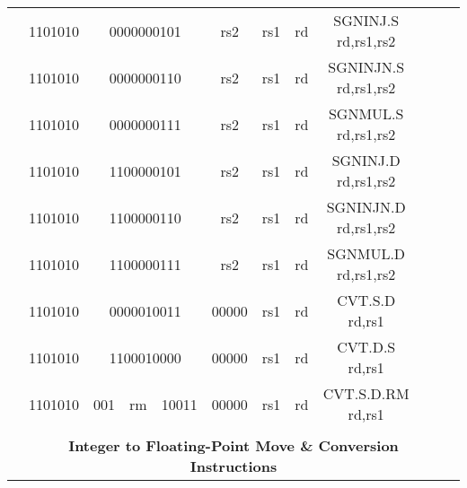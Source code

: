 \begin{table}[p]
\begin{small}
\begin{center}
\begin{tabular}{rcccccccccccl}
&
\multicolumn{1}{|c|}{1101010} &
\multicolumn{4}{c|}{0000000101} &
\multicolumn{1}{c|}{rs2} &
\multicolumn{1}{c|}{rs1} &
\multicolumn{1}{c|}{rd} & SGNINJ.S rd,rs1,rs2 \\
\cline{2-9}
  

&
\multicolumn{1}{|c|}{1101010} &
\multicolumn{4}{c|}{0000000110} &
\multicolumn{1}{c|}{rs2} &
\multicolumn{1}{c|}{rs1} &
\multicolumn{1}{c|}{rd} & SGNINJN.S rd,rs1,rs2 \\
\cline{2-9}
  

&
\multicolumn{1}{|c|}{1101010} &
\multicolumn{4}{c|}{0000000111} &
\multicolumn{1}{c|}{rs2} &
\multicolumn{1}{c|}{rs1} &
\multicolumn{1}{c|}{rd} & SGNMUL.S rd,rs1,rs2 \\
\cline{2-9}
  

&
\multicolumn{1}{|c|}{1101010} &
\multicolumn{4}{c|}{1100000101} &
\multicolumn{1}{c|}{rs2} &
\multicolumn{1}{c|}{rs1} &
\multicolumn{1}{c|}{rd} & SGNINJ.D rd,rs1,rs2 \\
\cline{2-9}
  

&
\multicolumn{1}{|c|}{1101010} &
\multicolumn{4}{c|}{1100000110} &
\multicolumn{1}{c|}{rs2} &
\multicolumn{1}{c|}{rs1} &
\multicolumn{1}{c|}{rd} & SGNINJN.D rd,rs1,rs2 \\
\cline{2-9}
  

&
\multicolumn{1}{|c|}{1101010} &
\multicolumn{4}{c|}{1100000111} &
\multicolumn{1}{c|}{rs2} &
\multicolumn{1}{c|}{rs1} &
\multicolumn{1}{c|}{rd} & SGNMUL.D rd,rs1,rs2 \\
\cline{2-9}
  

&
\multicolumn{1}{|c|}{1101010} &
\multicolumn{4}{c|}{0000010011} &
\multicolumn{1}{c|}{00000} &
\multicolumn{1}{c|}{rs1} &
\multicolumn{1}{c|}{rd} & CVT.S.D rd,rs1 \\
\cline{2-9}
  

&
\multicolumn{1}{|c|}{1101010} &
\multicolumn{4}{c|}{1100010000} &
\multicolumn{1}{c|}{00000} &
\multicolumn{1}{c|}{rs1} &
\multicolumn{1}{c|}{rd} & CVT.D.S rd,rs1 \\
\cline{2-9}
  

&
\multicolumn{1}{|c|}{1101010} &
\multicolumn{1}{c|}{001} &
\multicolumn{1}{c|}{rm} &
\multicolumn{2}{c|}{10011} &
\multicolumn{1}{c|}{00000} &
\multicolumn{1}{c|}{rs1} &
\multicolumn{1}{c|}{rd} & CVT.S.D.RM rd,rs1 \\
\cline{2-9}
  

&
\multicolumn{11}{c}{} & \\
&
\multicolumn{11}{c}{\bf Integer to Floating-Point Move \& Conversion Instructions} & \\
\cline{2-9}
  


\end{tabular}
\end{center}
\end{small}
\end{table}
